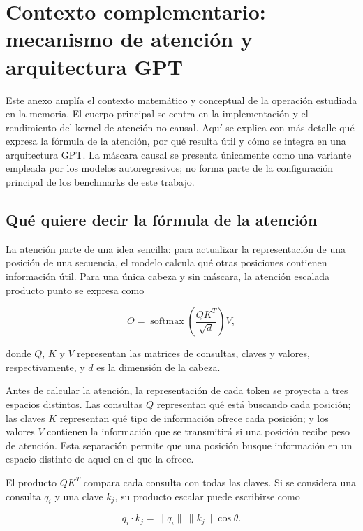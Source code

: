 \chapter{Contexto complementario: mecanismo de atención y arquitectura GPT}\label{anexo_atencion}

Este anexo amplía el contexto matemático y conceptual de la operación estudiada en la memoria. El cuerpo principal se centra en la implementación y el rendimiento del kernel de atención no causal. Aquí se explica con más detalle qué expresa la fórmula de la atención, por qué resulta útil y cómo se integra en una arquitectura GPT. La máscara causal se presenta únicamente como una variante empleada por los modelos autoregresivos; no forma parte de la configuración principal de los benchmarks de este trabajo.

\section{Qué quiere decir la fórmula de la atención}

La atención parte de una idea sencilla: para actualizar la representación de una posición de una secuencia, el modelo calcula qué otras posiciones contienen información útil. Para una única cabeza y sin máscara, la atención escalada producto punto se expresa como

\begin{equation}
O = \operatorname{softmax}\left(\frac{QK^{T}}{\sqrt{d}}\right)V,
\label{eq:attn_appendix}
\end{equation}

donde \(Q\), \(K\) y \(V\) representan las matrices de consultas, claves y valores, respectivamente, y \(d\) es la dimensión de la cabeza.

Antes de calcular la atención, la representación de cada token se proyecta a tres espacios distintos. Las consultas \(Q\) representan qué está buscando cada posición; las claves \(K\) representan qué tipo de información ofrece cada posición; y los valores \(V\) contienen la información que se transmitirá si una posición recibe peso de atención. Esta separación permite que una posición busque información en un espacio distinto de aquel en el que la ofrece.

El producto \(QK^T\) compara cada consulta con todas las claves. Si se considera una consulta \(q_i\) y una clave \(k_j\), su producto escalar puede escribirse como

\begin{equation}
q_i\cdot k_j = \lVert q_i\rVert\,\lVert k_j\rVert\cos\theta.
\end{equation}

